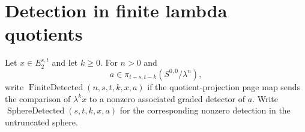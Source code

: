 \section{Detection in finite lambda quotients}
\begin{definition}
\label{sem:Main:finite-detection}
Let $x\in E_2^{s,t}$ and let $k\geq0$. For $n>0$ and
\[
 a\in\pi_{t-s,t-k}(S^{0,0}/\lambda^n),
\]
write $\operatorname{FiniteDetected}(n,s,t,k,x,a)$ if the quotient-projection page map sends the comparison of $\lambda^kx$ to a nonzero associated graded detector of $a$.
Write $\operatorname{SphereDetected}(s,t,k,x,a)$ for the corresponding nonzero detection in the untruncated sphere.
\end{definition}

